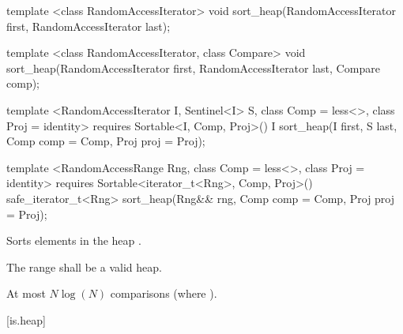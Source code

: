 %
\begin{removedblock}
\begin{itemdecl}
template <class RandomAccessIterator>
  void sort_heap(RandomAccessIterator first, RandomAccessIterator last);

template <class RandomAccessIterator, class Compare>
  void sort_heap(RandomAccessIterator first, RandomAccessIterator last,
                 Compare comp);
\end{itemdecl}
\end{removedblock}
\begin{addedblock}
\begin{itemdecl}
template <RandomAccessIterator I, Sentinel<I> S, class Comp = less<>,
    class Proj = identity>
  requires Sortable<I, Comp, Proj>()
  I sort_heap(I first, S last, Comp comp = Comp{}, Proj proj = Proj{});

template <RandomAccessRange Rng, class Comp = less<>, class Proj = identity>
  requires Sortable<iterator_t<Rng>, Comp, Proj>()
  safe_iterator_t<Rng>
    sort_heap(Rng&& rng, Comp comp = Comp{}, Proj proj = Proj{});
\end{itemdecl}
\end{addedblock}

\begin{itemdescr}
\pnum
\effects
Sorts elements in the heap
.

\pnum
\requires The range  shall be a valid heap.

\begin{addedblock}
\pnum
\returns {}
\end{addedblock}

\pnum
\complexity
At most $N \log(N)$
comparisons (where
).
\end{itemdescr}

[is.heap]{}

